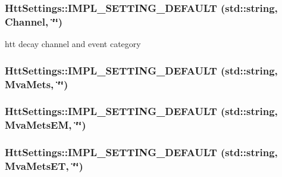 \label{classHttSettings_abe7e0c6ca1d63a2ad87bd40567eccd61}
\hypertarget{classHttSettings_ad95fcd09e68f5825da98b58adf7e868f}{
\subsubsection[{IMPL\_\-SETTING\_\-DEFAULT}]{\setlength{\rightskip}{0pt plus 5cm}HttSettings::IMPL\_\-SETTING\_\-DEFAULT (std::string, \/  Channel, \/  \char`\"{}\char`\"{})}}
\label{classHttSettings_ad95fcd09e68f5825da98b58adf7e868f}


htt decay channel and event category \hypertarget{classHttSettings_a9efcc755d91c4adf0eaee0c3c5caa413}{
\subsubsection[{IMPL\_\-SETTING\_\-DEFAULT}]{\setlength{\rightskip}{0pt plus 5cm}HttSettings::IMPL\_\-SETTING\_\-DEFAULT (std::string, \/  MvaMets, \/  \char`\"{}\char`\"{})}}
\label{classHttSettings_a9efcc755d91c4adf0eaee0c3c5caa413}
\hypertarget{classHttSettings_a73b5e6629b9a83be1f201ade3a53cb4a}{
\subsubsection[{IMPL\_\-SETTING\_\-DEFAULT}]{\setlength{\rightskip}{0pt plus 5cm}HttSettings::IMPL\_\-SETTING\_\-DEFAULT (std::string, \/  MvaMetsEM, \/  \char`\"{}\char`\"{})}}
\label{classHttSettings_a73b5e6629b9a83be1f201ade3a53cb4a}
\hypertarget{classHttSettings_a3d01e1ff66021ed02442fe9fc5427181}{
\subsubsection[{IMPL\_\-SETTING\_\-DEFAULT}]{\setlength{\rightskip}{0pt plus 5cm}HttSettings::IMPL\_\-SETTING\_\-DEFAULT (std::string, \/  MvaMetsET, \/  \char`\"{}\char`\"{})}}
